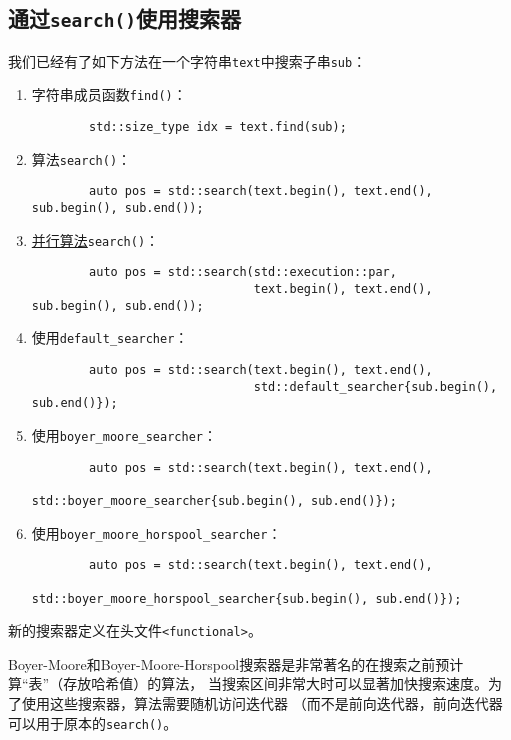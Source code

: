 \subsection{通过\texttt{search()}使用搜索器}
我们已经有了如下方法在一个字符串\texttt{text}中搜索子串\texttt{sub}：
\begin{enumerate}
    \item 字符串成员函数\texttt{find()}：
    \begin{lstlisting}
        std::size_type idx = text.find(sub);
    \end{lstlisting}
    \item 算法\texttt{search()}：
    \begin{lstlisting}
        auto pos = std::search(text.begin(), text.end(), sub.begin(), sub.end());
    \end{lstlisting}
    \item \hyperref[ch22]{并行算法}\texttt{search()}：
    \begin{lstlisting}
        auto pos = std::search(std::execution::par,
                               text.begin(), text.end(), sub.begin(), sub.end());
    \end{lstlisting}
    \item 使用\texttt{default\_searcher}：
    \begin{lstlisting}
        auto pos = std::search(text.begin(), text.end(),
                               std::default_searcher{sub.begin(), sub.end()});
    \end{lstlisting}
    \item 使用\texttt{boyer\_moore\_searcher}：
    \begin{lstlisting}
        auto pos = std::search(text.begin(), text.end(),
                               std::boyer_moore_searcher{sub.begin(), sub.end()});
    \end{lstlisting}
    \item 使用\texttt{boyer\_moore\_horspool\_searcher}：
    \begin{lstlisting}
        auto pos = std::search(text.begin(), text.end(),
                               std::boyer_moore_horspool_searcher{sub.begin(), sub.end()});
    \end{lstlisting}
\end{enumerate}
新的搜索器定义在头文件\texttt{<functional>}。

Boyer-Moore和Boyer-Moore-Horspool搜索器是非常著名的在搜索之前预计算“表”（存放哈希值）的算法，
当搜索区间非常大时可以显著加快搜索速度。为了使用这些搜索器，算法需要随机访问迭代器
（而不是前向迭代器，前向迭代器可以用于原本的\texttt{search()}。

